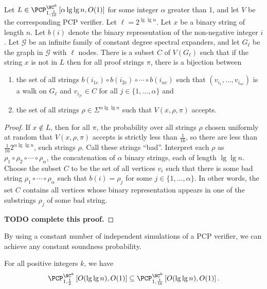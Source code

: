\documentclass{article}
\newcommand{\PCPcs}[5]{\PCP^{#1}_{#2, #3}\left[#4, #5\right]}
\begin{document}
\begin{lemma}\label{lem:badsubset}
  Let $L \in \PCPcs{\NC^k}{1}{\frac{1}{16}}{\alpha \lg \lg n}{O(1)}$ for some integer $\alpha$ greater than 1, and let $V$ be the corresponding PCP verifier.
  Let $\ell = 2^{\lg \lg n}$.
  Let $x$ be a binary string of length $n$.
  Let $b(i)$ denote the binary representation of the non-negative integer $i$.
  Let $\mathcal{G}$ be an infinite family of constant degree spectral expanders, and let $G_\ell$ be the graph in $\mathcal{G}$ with $\ell$ nodes.
  There is a subset $C$ of $V(G_\ell)$ such that if the string $x$ is not in $L$ then for all proof strings $\pi$, there is a bijection between
  \begin{enumerate}
  \item the set of all strings $b(i_{1c}) \circ b(i_{2c}) \circ \dotsb \circ b(i_{\alpha c})$ such that $(v_{i_1}, \dotsc, v_{i_{\alpha c}})$ is a walk on $G_\ell$ and $v_{i_{jc}} \in C$ for all $j \in \{1, \dotsc, \alpha\}$ and
  \item the set of all strings $\rho \in \Sigma^{\alpha \lg \lg n}$ such that $V(x, \rho, \pi)$ accepts.
  \end{enumerate}
\end{lemma}
\begin{proof}
  If $x \notin L$, then for all $\pi$, the probability over all strings $\rho$ chosen uniformly at random that $V(x, \rho, \pi)$ accepts is strictly less than $\frac{1}{16}$, so there are less than $\frac{1}{16} 2^{\alpha \lg \lg n}$, such strings $\rho$.
  Call these strings ``bad''.
  Interpret each $\rho$ as $\rho_1 \circ \rho_2 \circ \dotsb \circ \rho_\alpha$, the concatenation of $\alpha$ binary strings, each of length $\lg \lg n$.
  Choose the subset $C$ to be the set of all vertices $v_i$ such that there is some bad string $\rho_1 \circ \dotsb \circ \rho_\alpha$ such that $b(i) = \rho_j$ for some $j \in \{1, \dotsc, \alpha\}$.
  In other words, the set $C$ contains all vertices whose binary representation appears in one of the substrings $\rho_j$ of some bad string.

  \textbf{TODO complete this proof.}
\end{proof}

By using a constant number of independent simulations of a PCP verifier, we can achieve any constant soundness probability.

\begin{lemma}\label{lem:16}
  For all positive integers $k$, we have
  \begin{equation*}
    \PCPcs{\NC^k}{1}{\frac{1}{2}}{O(\lg \lg n)}{O(1)}
    \subseteq
    \PCPcs{\NC^k}{1}{\frac{1}{16}}{O(\lg \lg n)}{O(1)}.
  \end{equation*}
\end{lemma}
\end{document}
